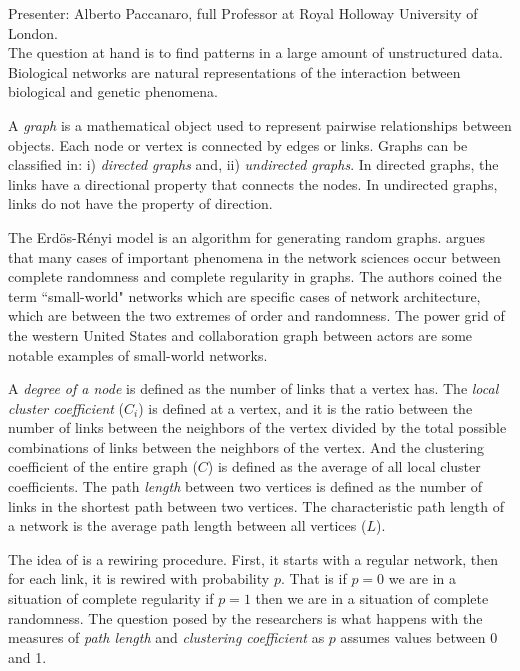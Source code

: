 \documentclass[9pt,a4paper]{article}
\begin{document}
Presenter: Alberto Paccanaro,  full Professor at Royal Holloway University of London.\\

The question at hand is to find patterns in a large amount of unstructured data. 
Biological networks are natural representations of the interaction between biological and genetic phenomena. 

A \textit{graph} is a mathematical object used to represent pairwise relationships between objects. Each node or vertex is connected by edges or links. Graphs can be classified in: i) \textit{directed graphs} and, ii) \textit{undirected graphs}. 
In directed graphs, the links have a directional property that connects the nodes. In undirected graphs, links do not have the property of direction. 

The Erdös-Rényi model is an algorithm for generating random graphs. 
\cite{watts_strogatz_1998} argues that many cases of important phenomena in the network sciences occur between complete randomness and complete regularity in graphs. 
The authors coined the term ``small-world" networks which are specific cases of network architecture, which are between the two extremes of order and randomness. 
The power grid of the western United States and collaboration graph between actors are some notable examples of small-world networks. 
 
A \textit{degree of a node} is defined as the number of links that a vertex has. 
The \textit{local cluster coefficient} ($C_i$) is defined at a vertex, and it is the ratio between the number of links between the neighbors of the vertex divided by the total possible combinations of links between the neighbors of the vertex. 
And the clustering coefficient of the entire graph ($C$) is defined as the average of all local cluster coefficients.
The path \textit{length} between two vertices is defined as the number of links in the shortest path between two vertices. 
The characteristic path length of a network is the average path length between all vertices ($L$).

The idea of \cite{watts_strogatz_1998} is a rewiring procedure. First, it starts with a regular network, then for each link, it is rewired with probability $p$. That is if $p=0$ we are in a situation of complete regularity if $p=1$ then we are in a situation of complete randomness. The question posed by the researchers is what happens with the measures of \textit{path length} and \textit{clustering coefficient} as $p$ assumes values between 0 and 1.
\end{document}
